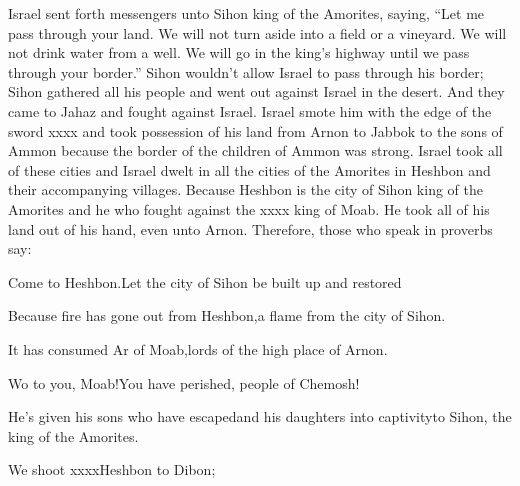 \begin{inparaenum}
   Israel sent forth messengers unto Sihon king of the Amorites, saying,%
   ``Let me pass through your land. We will not turn aside into a field or a vineyard. We will not drink water from a well. We will go in the king's highway until we pass through your border.''%
   Sihon wouldn't allow Israel to pass through his border; Sihon gathered all his people and went out against Israel in the desert. And they came to Jahaz and fought against Israel.%
   Israel smote him with the edge of the sword xxxx and took possession of his land from Arnon to Jabbok to the sons of Ammon because the border of the children of Ammon was strong.%
   Israel took all of these cities and Israel dwelt in all the cities of the Amorites in Heshbon and their accompanying villages.%
   Because Heshbon is the city of Sihon king of the Amorites and he who fought against the xxxx king of Moab. He took all of his land out of his hand, even unto Arnon.%
   Therefore, those who speak in proverbs say:\smallskip%

  \pb{}Come to Heshbon.\pa{}Let the city of Sihon be built up and restored%

  \pa{} Because fire has gone out from Heshbon,\pa{}a flame from the city of Sihon.%

  \pb{}It has consumed Ar%
  of Moab,\pa{}lords of the high place of Arnon.%

  \pa{} Wo to you, Moab!\pa{}You have perished, people of Chemosh!%

  \pb{}He's given his sons who have escaped\pa{}and his daughters into captivity\pa{}to Sihon, the king of the Amorites.%

  \pa{} We shoot xxxx\pa{}Heshbon to Dibon;%


\end{inparaenum}
